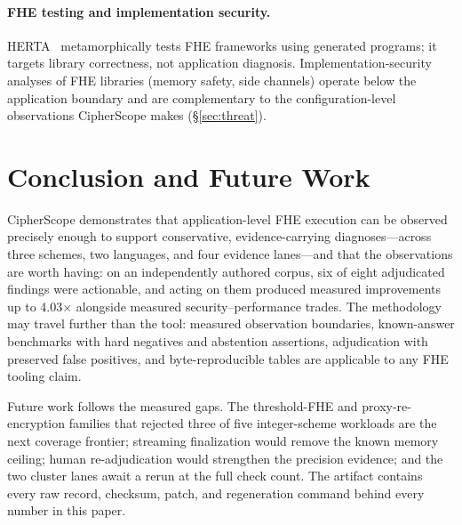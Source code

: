 \documentclass[sigconf,nonacm]{acmart}
\begin{document}
\paragraph{FHE testing and implementation security.}
HERTA~\cite{herta2026} metamorphically tests FHE frameworks using generated
programs; it targets library correctness, not application diagnosis.
Implementation-security analyses of FHE libraries (memory safety, side
channels) operate below the application boundary and are complementary to
the configuration-level observations CipherScope makes
(\S\ref{sec:threat}).

\section{Conclusion and Future Work}
\label{sec:conclusion}

CipherScope demonstrates that application-level FHE execution can be
observed precisely enough to support conservative, evidence-carrying
diagnoses---across three schemes, two languages, and four evidence
lanes---and that the observations are worth having: on an independently
authored corpus, six of eight adjudicated findings were actionable, and
acting on them produced measured improvements up to 4.03$\times$ alongside
measured security--performance trades. The methodology may travel further
than the tool: measured observation boundaries, known-answer benchmarks
with hard negatives and abstention assertions, adjudication with preserved
false positives, and byte-reproducible tables are applicable to any FHE
tooling claim.

Future work follows the measured gaps. The threshold-FHE and
proxy-re-encryption families that rejected three of five integer-scheme
workloads are the next coverage frontier; streaming finalization would
remove the known memory ceiling; human re-adjudication would strengthen the
precision evidence; and the two cluster lanes await a rerun at the full
check count. The artifact contains every raw record, checksum, patch, and
regeneration command behind every number in this paper.



\end{document}
